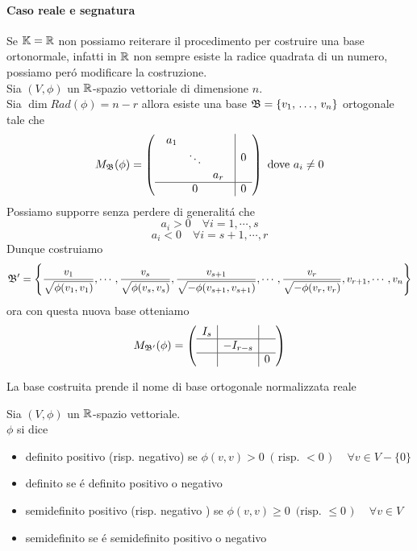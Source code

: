 \paragraph{Caso reale e segnatura}
Se $\mathbb{K}=\mathbb{R}$ non possiamo reiterare il procedimento per costruire una base ortonormale, infatti in $\mathbb{R}$ non sempre esiste la radice quadrata di un numero, possiamo per\'o modificare la costruzione.\\
Sia $(V,\phi) $ un $\mathbb{R}$-spazio vettoriale di dimensione $n$.\\
Sia $\dim Rad (\phi)= n-r$ allora esiste una base $\mathfrak{B}=\{ v_1, \, \dots , \, v_n \}$ ortogonale tale che 
$$ M_{\mathfrak{B}}(\phi) = \left( \begin{array}{c|c}
\begin{array}{ccc}
a_1 & & \\
 & \ddots &  \\
& & a_r 
\end{array}  &0 \\ \hline 0&0
\end{array}\right)  \text{ dove } a_i \neq 0$$
Possiamo supporre senza perdere di generalit\'a che 
$$ a_i >0 \quad \forall i = 1, \cdots, s $$ 
$$ a_i <0 \quad \forall i=s+1, \cdots , r $$
Dunque costruiamo 
$$ \mathfrak{B}'= \left \{ \frac{v_1}{\sqrt{\phi(v_1, v_1)}}, \cdots , \frac{v_s}{\sqrt{\phi(v_s, v_s)}}, \frac{v_{s+1}}{\sqrt{- \phi(v_{s+1} , v_{s+1})}} , \cdots ,  \frac{v_{r}}{\sqrt{- \phi(v_{r} , v_{r})}}, v_{r+1}, \cdots, v_n \right\}$$
ora con questa nuova base otteniamo 
$$ M_{\mathfrak{B}'}(\phi) = \left( \begin{array}{c|c|c}
I_s & & \\ \hline 
& - I_{r-s}  & \\ \hline
& & 0 
\end{array} \right)$$
\begin{defn}La base costruita prende il nome di base ortogonale normalizzata reale
\end{defn}
\spazio
\begin{defn} Sia $(V,\phi)$ un $\mathbb{R}$-spazio vettoriale.\\
$\phi$ si dice
\begin{itemize}
\item definito positivo (risp. negativo)  se $\phi(v,v) >0 \, \text{ ( risp. } <0 \text{ ) }   \quad \forall v \in V - \{  0\} $
\item definito se \'e definito positivo o negativo
\item semidefinito positivo  (risp. negativo ) se $\phi(v,v ) \geq 0 \, \text{ (risp. } \leq 0 \text{ ) } \quad \forall v \in V$
\item semidefinito se \'e semidefinito positivo o negativo
\end{itemize}
\end{defn}
